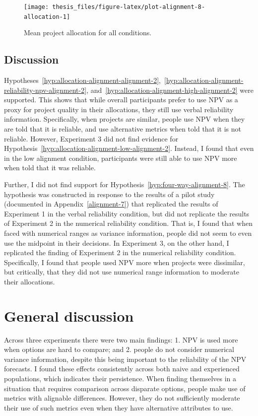 \documentclass[a4paper, nobind, dvipsnames]{templates/ociamthesis}
\theoremstyle{definition}
\theoremstyle{definition}
\theoremstyle{definition}
\theoremstyle{definition}
\theoremstyle{remark}
\begin{document}
\begin{figure}
\texttt{[image: thesis\_files/figure-latex/plot-alignment-8-allocation-1]} \caption{Mean project allocation for all conditions.}\label{fig:plot-alignment-8-allocation}
\end{figure}

\hypertarget{discussion-3}{%
\subsection{Discussion}\label{discussion-3}}

Hypotheses~\ref{hyp:allocation-alignment-alignment-2},~\ref{hyp:allocation-alignment-reliability-npv-alignment-2},
and~\ref{hyp:allocation-alignment-high-alignment-2} were supported. This shows
that while overall participants prefer to use NPV as a proxy for project quality
in their allocations, they still use verbal reliability information.
Specifically, when projects are similar, people use NPV when they are told that
it is reliable, and use alternative metrics when told that it is not reliable.
However, Experiment 3 did not find evidence for
Hypothesis~\ref{hyp:allocation-alignment-low-alignment-2}. Instead, I found
that even in the low alignment condition, participants were still able to use
NPV more when told that it was reliable.

Further, I did not find support for Hypothesis~\ref{hyp:four-way-alignment-8}.
The hypothesis was constructed in response to the results of a pilot study
(documented in Appendix~\ref{alignment-7}) that replicated the results of
Experiment 1 in the verbal reliability condition, but did not replicate the
results of Experiment 2 in the numerical reliability condition. That is, I found
that when faced with numerical ranges as variance information, people did not
seem to even use the midpoint in their decisions. In Experiment 3, on the other
hand, I replicated the finding of Experiment 2 in the numerical reliability
condition. Specifically, I found that people used NPV more when projects were
dissimilar, but critically, that they did not use numerical range information to
moderate their allocations.

\hypertarget{general-discussion-1}{%
\section{General discussion}\label{general-discussion-1}}

Across three experiments there were two main findings: 1. NPV is used more when
options are hard to compare; and 2. people do not consider numerical variance
information, despite this being important to the reliability of the NPV
forecasts. I found these effects consistently across both naive and experienced
populations, which indicates their persistence. When finding themselves in a
situation that requires comparison across disparate options, people make use of
metrics with alignable differences. However, they do not sufficiently moderate
their use of such metrics even when they have alternative attributes to use.
\end{document}
